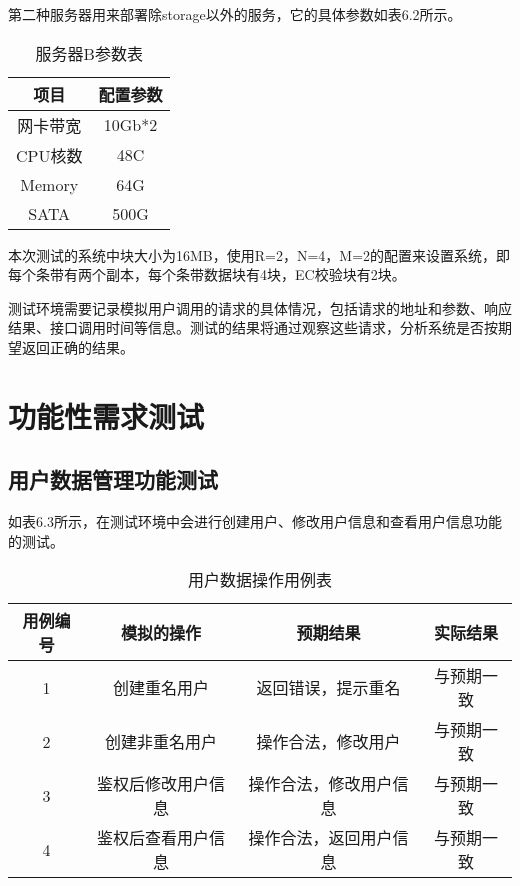 第二种服务器用来部署除storage以外的服务，它的具体参数如表6.2所示。

\begin{table}[h]
    \centering
    \caption{服务器B参数表}
    \begin{tabular}{cc}
      \toprule
      项目   & 配置参数   \\
      \midrule
      网卡带宽  & 10Gb*2  \\
      CPU核数   & 48C     \\
      Memory   & 64G      \\
      SATA     & 500G   \\
      \bottomrule
    \end{tabular}
\end{table}

本次测试的系统中块大小为16MB，使用R=2，N=4，M=2的配置来设置系统，即每个条带有两个副本，每个条带数据块有4块，EC校验块有2块。

测试环境需要记录模拟用户调用的请求的具体情况，包括请求的地址和参数、响应结果、接口调用时间等信息。测试的结果将通过观察这些请求，分析系统是否按期望返回正确的结果。

\section{功能性需求测试}

\subsection{用户数据管理功能测试}

如表6.3所示，在测试环境中会进行创建用户、修改用户信息和查看用户信息功能的测试。

\begin{table}[h]
  \centering
  \caption{用户数据操作用例表}
  \begin{tabular}{cccc}
    \toprule
    用例编号 & 模拟的操作   & 预期结果   & 实际结果 \\
    \midrule
    1 & 创建重名用户        & 返回错误，提示重名      & 与预期一致 \\
    2 & 创建非重名用户      & 操作合法，修改用户      & 与预期一致   \\
    3 & 鉴权后修改用户信息   & 操作合法，修改用户信息  & 与预期一致    \\
    4 & 鉴权后查看用户信息   & 操作合法，返回用户信息  & 与预期一致    \\
    \bottomrule
  \end{tabular}
\end{table}

